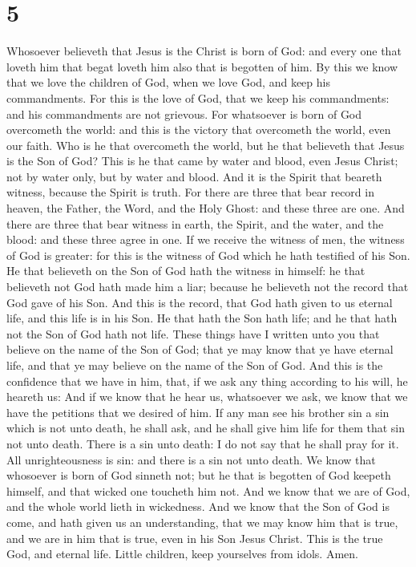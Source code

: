 \hypertarget{section-4}{%
\section{5}\label{section-4}}

 Whosoever believeth that Jesus is the Christ is born of
God: and every one that loveth him that begat loveth him also that is
begotten of him.  By this we know that we love the
children of God, when we love God, and keep his commandments.
 For this is the love of God, that we keep his
commandments: and his commandments are not grievous.  For
whatsoever is born of God overcometh the world: and this is the victory
that overcometh the world, even our faith.  Who is he that
overcometh the world, but he that believeth that Jesus is the Son of
God?  This is he that came by water and blood, even Jesus
Christ; not by water only, but by water and blood. And it is the Spirit
that beareth witness, because the Spirit is truth.  For
there are three that bear record in heaven, the Father, the Word, and
the Holy Ghost: and these three are one.  And there are
three that bear witness in earth, the Spirit, and the water, and the
blood: and these three agree in one.  If we receive the
witness of men, the witness of God is greater: for this is the witness
of God which he hath testified of his Son.  He that
believeth on the Son of God hath the witness in himself: he that
believeth not God hath made him a liar; because he believeth not the
record that God gave of his Son.  And this is the record,
that God hath given to us eternal life, and this life is in his Son.
 He that hath the Son hath life; and he that hath not the
Son of God hath not life.  These things have I written
unto you that believe on the name of the Son of God; that ye may know
that ye have eternal life, and that ye may believe on the name of the
Son of God.  And this is the confidence that we have in
him, that, if we ask any thing according to his will, he heareth us:
 And if we know that he hear us, whatsoever we ask, we
know that we have the petitions that we desired of him. 
If any man see his brother sin a sin which is not unto death, he shall
ask, and he shall give him life for them that sin not unto death. There
is a sin unto death: I do not say that he shall pray for it.
 All unrighteousness is sin: and there is a sin not unto
death.  We know that whosoever is born of God sinneth
not; but he that is begotten of God keepeth himself, and that wicked one
toucheth him not.  And we know that we are of God, and
the whole world lieth in wickedness.  And we know that
the Son of God is come, and hath given us an understanding, that we may
know him that is true, and we are in him that is true, even in his Son
Jesus Christ. This is the true God, and eternal life. 
Little children, keep yourselves from idols. Amen.
